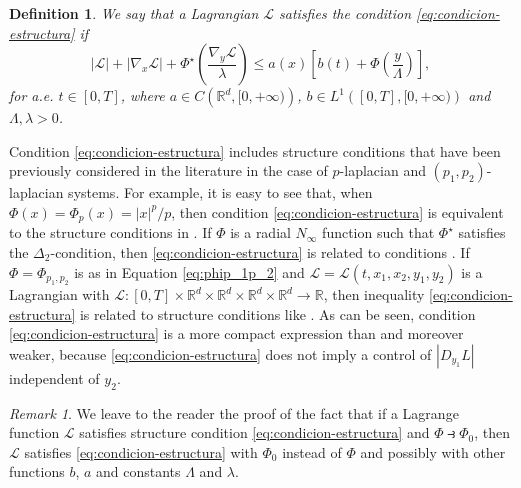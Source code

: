 \documentclass[twoside]{article}
\newtheorem{defi}[thm]{Definition}
\theoremstyle{remark}
\newtheorem{comentario}{Remark}
\newcounter{example}[section]
\newcommand{\rr}{\mathbb{R}}
\renewcommand{\leq}{\leqslant}
\begin{document}
\begin{defi}\label{def:estructura} We say that a Lagrangian $\mathcal{L}$ satisfies the condition \eqref{eq:condicion-estructura} if
\begin{equation}\label{eq:condicion-estructura}
  |\mathcal{L}|+ |\nabla_{x}\mathcal{L}|+\Phi^{\star}\left(\frac{\nabla_{y}\mathcal{L}}{\lambda}\right)
\leq
a(x)\left[b(t)+ \Phi\left(\frac{y}{\Lambda}\right)\right], \tag{$S$}
\end{equation}
for a.e. $t\in [0,T]$,
where  $a\in C\left(\mathbb{R}^d,[0,+\infty)\right)$, $b\in L^1\left([0,T],[0,+\infty)\right) $ and $\Lambda,\lambda>0$.
\end{defi}

Condition \eqref{eq:condicion-estructura} includes structure conditions that have  been previously considered in the literature in the case of $p$-laplacian and $(p_1,p_2)$-laplacian systems. For example, it is easy to see that, when $\Phi(x)=\Phi_p(x)=|x|^p/p$, then  condition \eqref{eq:condicion-estructura}  is equivalent to the structure conditions in  \cite[Thm. 1.4]{mawhin2010critical}.  If $\Phi$ is a radial $N_{\infty}$ function such that $\Phi^{\star}$ satisfies  the $\Delta_2$-condition,  then \eqref{eq:condicion-estructura} is related to conditions  \cite[Eq. (2)-(4)]{ABGMS2015}.   If $\Phi=\Phi_{p_1,p_2}$ is as in Equation \eqref{eq:phip_1p_2} and $\mathcal{L}=\mathcal{L}(t,x_1,x_2,y_1,y_2)$ is a Lagrangian with $\mathcal{L}:[0,T]\times\rr^d\times\rr^d\times\rr^d\times\rr^d\to\rr$, then inequality \eqref{eq:condicion-estructura} is related to structure conditions like
\cite[Lemma 3.1, Eq. (3.1)]{Tian2007192}. As can be seen, condition \eqref{eq:condicion-estructura} is a more compact expression than \cite[Lemma 3.1, Eq. (3.1)]{Tian2007192} and moreover   weaker, because  \eqref{eq:condicion-estructura} does not imply a control of
$|D_{y_1}L|$ independent of $y_2$. 



\begin{comentario} We leave to the reader the proof of the fact that if a Lagrange function $\mathcal{L}$ satisfies structure condition \eqref{eq:condicion-estructura} and $\Phi\strictif \Phi_0$, then $\mathcal{L}$ satisfies \eqref{eq:condicion-estructura} with $\Phi_0$ instead of $\Phi$ and possibly with other functions $b$, $a$ and constants $\Lambda$ and $\lambda$.
 \end{comentario}
\end{document}
